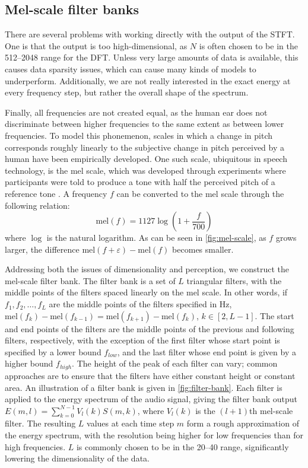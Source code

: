 \subsection{Mel-scale filter banks}

There are several problems with working directly with the output of the STFT. One is that the output is too high-dimensional, as $N$ is often chosen to be in the \numrange{512}{2048} range for the DFT.
Unless very large amounts of data is available, this causes data sparsity issues, which can cause many kinds of models to underperform.
Additionally, we are not really interested in the exact energy at every frequency step, but 
rather the overall shape of the spectrum.

Finally, all frequencies are not created equal, as the human ear does not discriminate between higher frequencies to the same extent as between lower frequencies.
To model this phonemenon, scales in which a change in pitch corresponds roughly linearly to the subjective change in pitch perceived by a human have been empirically developed.
One such scale, ubiquitous in speech technology, is the mel scale, which was developed through experiments where participants were told to produce a tone with half the perceived pitch of a reference tone \parencite{stevens1937scale}.
A frequency $f$ can be converted to the mel scale through the following relation:
\[
  \mathrm{mel}(f) = 1127\log\left(1 + \frac{f}{700}\right)
\]
where $\log$ is the natural logarithm.
As can be seen in \cref{fig:mel-scale}, as $f$ grows larger, the difference $\mathrm{mel}(f+\varepsilon) - \mathrm{mel}(f)$ becomes smaller.

Addressing both the issues of dimensionality and perception, we construct the mel-scale filter bank.
The filter bank is a set of $L$ triangular filters, with the middle points of the filters spaced linearly on the mel scale.
In other words, if $f_1, f_2, \dots, f_L$ are the middle points of the filters specified in \si{\Hz}, $\mathrm{mel}(f_k) - \mathrm{mel}(f_{k-1}) = \mathrm{mel}(f_{k+1}) - \mathrm{mel}(f_k)$, $k \in [2, L-1]$.
The start and end points of the filters are the middle points of the previous and following filters, respectively, with the exception of the first filter whose start point is specified by a lower bound $f_{low}$, and the last filter whose end point is given by a higher bound $f_{high}$.
The height of the peak of each filter can vary; common approaches are to ensure that the filters have either constant height or constant area.
An illustration of a filter bank is given in \cref{fig:filter-bank}.
Each filter is applied to the energy spectrum of the audio signal, giving the filter bank output $E(m,l) = \sum_{k=0}^{N-1}V_l(k)S(m,k)$, where $V_l(k)$ is the $(l+1)$th mel-scale filter.
The resulting $L$ values at each time step $m$ form a rough approximation of the energy spectrum, with the resolution being higher for low frequencies than for high frequencies.
$L$ is commonly chosen to be in the \numrange{20}{40} range, significantly lowering the dimensionality of the data.

